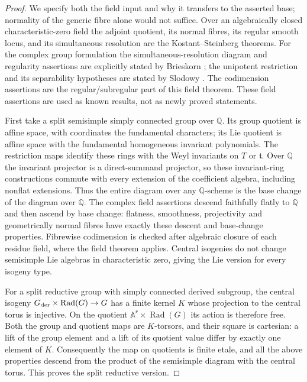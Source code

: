 \begin{proof}
We specify both the field input and why it transfers to the asserted
base; normality of the generic fibre alone would not suffice.
Over an algebraically closed characteristic-zero field the adjoint
quotient, its normal fibres, its regular smooth locus, and its
simultaneous resolution are the Kostant--Steinberg theorems.  For the
complex group formulation the simultaneous-resolution diagram and
regularity assertions are explicitly stated by Brieskorn
\cite[pp.279--280]{D-Brieskorn}; the unipotent restriction and its
separability hypotheses are stated by Slodowy
\cite[\S4.1, pp.43--44]{D-Slodowy}.  The codimension assertions are
the regular/subregular part of this field theorem.  These field
assertions are used as known results, not as newly proved statements.

First take a split semisimple simply connected group over
$\mathbb Q$.  Its group quotient is affine space, with coordinates
the fundamental characters; its Lie quotient is affine space with
the fundamental homogeneous invariant polynomials.  The restriction
maps identify these rings with the Weyl invariants on $T$ or
$\mathfrak t$.  Over $\mathbb Q$ the invariant projector is a
direct-summand projector, so these invariant-ring constructions
commute with every extension of the coefficient algebra, including
nonflat extensions.  Thus the entire diagram over any
$\mathbb Q$-scheme is the base change of the diagram over
$\mathbb Q$.  The complex field assertions descend faithfully flatly
to $\mathbb Q$ and then ascend by base change: flatness, smoothness,
projectivity and geometrically normal fibres have exactly these
descent and base-change properties.  Fibrewise codimension is checked
after algebraic closure of each residue field, where the field theorem
applies.  Central isogenies do not change semisimple Lie algebras in
characteristic zero, giving the Lie version for every isogeny type.

For a split reductive group with simply connected derived subgroup,
the central isogeny
$G_{\rm der}\times\operatorname{Rad}(G)\to G$ has a finite kernel $K$ whose
projection to the central torus is injective.  On the quotient
$\mathbb A^r\times\operatorname{Rad}(G)$ its action is therefore free.  Both
the group and quotient maps are $K$-torsors, and their square is
cartesian: a lift of the group element and a lift of its quotient
value differ by exactly one element of $K$.
Consequently the map on quotients is finite etale, and all the above
properties descend from the product of the semisimple diagram with
the central torus.  This proves the split reductive version.


\end{proof}
